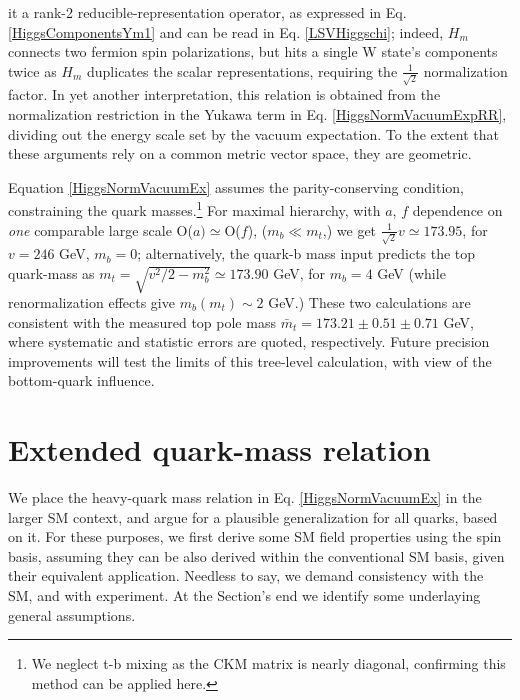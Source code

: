 \documentclass[12pt]{article}
\renewcommand\[{\begin{dmath}}
\renewcommand\]{\end{dmath}}
\begin{document}
it  a rank-2 reducible-representation operator, as expressed in  Eq.  \ref{HiggsComponentsYm1} and can be read in Eq. \ref{LSVHiggschi}; indeed,  $H_m$   connects two fermion spin polarizations, but  hits a single W state's components twice as $H_m$ duplicates the scalar representations, requiring the $\frac{1}{\sqrt{2}}$ normalization factor. In yet another interpretation, this relation is obtained from   the  normalization restriction in the Yukawa term  in Eq. \ref {HiggsNormVacuumExpRR},
dividing out the energy scale set by the vacuum expectation. To the extent that these arguments rely
on a common metric vector space,  they are     geometric.



 Equation \ref{HiggsNormVacuumEx} assumes the parity-conserving
condition,    constraining   the   quark masses.\footnote{We neglect  t-b mixing as the CKM matrix is  nearly diagonal\cite{ParticleData},
confirming  this method can be applied here.}   For maximal hierarchy\cite{BesproRicardo}, with  $a$, $f$ dependence
   on  {\it one }  comparable large scale O($a ) \simeq$O($ f$),   ($m_b \ll m_t$,)  we get $\frac{1}{\sqrt{ 2}}v\simeq  173.95   $, for $v=246$  GeV,   $m_b =0$;     alternatively, the quark-b mass input predicts  the top quark-mass as     $ m_t = \sqrt{v^2/2-m_b^2 }\simeq 173.90  $ GeV, for\cite{ParticleData}  $m_b = 4$ GeV (while renormalization effects give\cite{quarkrunmass} $m_b(m_t)\sim 2$ GeV.)
    These two calculations are consistent with   the measured  top pole mass\cite{ParticleData} $\bar m_t=173.21\pm 0.51\pm0.71 $  GeV, where systematic and statistic errors are quoted, respectively.   Future precision improvements will  test the limits of this tree-level calculation, with view of the bottom-quark influence.

\section{Extended quark-mass relation }
 We  place the heavy-quark mass relation in Eq. \ref{HiggsNormVacuumEx} in the larger  SM context, and  argue for a plausible  generalization for all quarks, based on it.  For these purposes, we first derive some SM field properties  using  the spin basis,  assuming  they can be also derived  within the  conventional SM  basis,  given their  equivalent application. Needless to say,
 we
 demand consistency  with   the
  SM,  and with experiment. At the Section's end we  identify some underlaying general assumptions.
\end{document}
